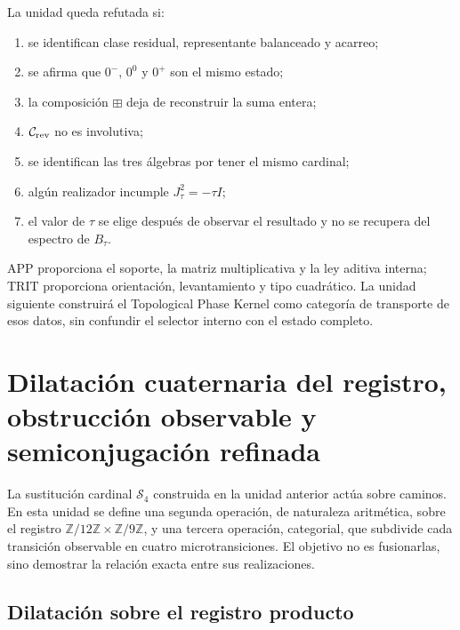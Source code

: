 \begin{criterion}
La unidad queda refutada si:
\begin{enumerate}
 \item se identifican clase residual, representante balanceado y acarreo;
 \item se afirma que \(0^-\), \(0^0\) y \(0^+\) son el mismo estado;
 \item la composición \(\boxplus\) deja de reconstruir la suma entera;
 \item \(\mathcal C_{\rm rev}\) no es involutiva;
 \item se identifican las tres álgebras por tener el mismo cardinal;
 \item algún realizador incumple \(J_\tau^2=-\tau I\);
 \item el valor de \(\tau\) se elige después de observar el resultado y no
       se recupera del espectro de \(B_\tau\).
\end{enumerate}
\end{criterion}

APP proporciona el soporte, la matriz multiplicativa y la ley aditiva
interna; TRIT proporciona orientación,
levantamiento y tipo cuadrático. La unidad siguiente construirá el
Topological Phase Kernel como categoría de transporte de esos datos, sin
confundir el selector interno con el estado completo.

\HMTDeferredTPKBase
\HMTDeferredTPKDevelopment



\section{Dilatación cuaternaria del registro, obstrucción observable y semiconjugación refinada}
\label{p12-83-c1-s12:chap:dilatacion-cuaternaria-semiconjugacion}

La sustitución cardinal \(\mathcal S_4\) construida en la unidad anterior
actúa sobre caminos. En esta unidad se define una segunda operación, de
naturaleza aritmética, sobre el registro
\(\mathbb Z/12\mathbb Z\times\mathbb Z/9\mathbb Z\), y una tercera
operación, categorial, que subdivide cada transición observable en cuatro
microtransiciones. El objetivo no es fusionarlas, sino demostrar la relación
exacta entre sus realizaciones.

\subsection{Dilatación sobre el registro producto}

